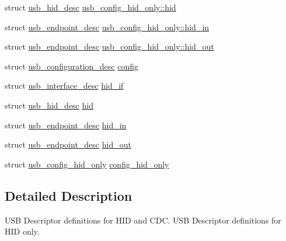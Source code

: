 \begin{DoxyCompactItemize}
\item 
struct \hyperlink{structusb__hid__desc}{usb\-\_\-hid\-\_\-desc} \hyperlink{group___p_i_o_s___u_s_b___d_e_s_c_ga279cdc579474d229bf1bb7963f423423}{usb\-\_\-config\-\_\-hid\-\_\-only\-::hid}
\item 
struct \hyperlink{structusb__endpoint__desc}{usb\-\_\-endpoint\-\_\-desc} \hyperlink{group___p_i_o_s___u_s_b___d_e_s_c_gac0401b402235f315c995eb13de1425ec}{usb\-\_\-config\-\_\-hid\-\_\-only\-::hid\-\_\-in}
\item 
struct \hyperlink{structusb__endpoint__desc}{usb\-\_\-endpoint\-\_\-desc} \hyperlink{group___p_i_o_s___u_s_b___d_e_s_c_ga0bdaf8c80f7739bea621a6d5aa272641}{usb\-\_\-config\-\_\-hid\-\_\-only\-::hid\-\_\-out}
\item 
struct \hyperlink{structusb__configuration__desc}{usb\-\_\-configuration\-\_\-desc} \hyperlink{group___p_i_o_s___u_s_b___d_e_s_c_ga6517677dcb9452a3759e7ec7e360e690}{config}
\item 
struct \hyperlink{structusb__interface__desc}{usb\-\_\-interface\-\_\-desc} \hyperlink{group___p_i_o_s___u_s_b___d_e_s_c_ga66dd41530dc7e219cf377870362857ce}{hid\-\_\-if}
\item 
struct \hyperlink{structusb__hid__desc}{usb\-\_\-hid\-\_\-desc} \hyperlink{group___p_i_o_s___u_s_b___d_e_s_c_ga6eb333cd7c6d156f25fa827aa085579c}{hid}
\item 
struct \hyperlink{structusb__endpoint__desc}{usb\-\_\-endpoint\-\_\-desc} \hyperlink{group___p_i_o_s___u_s_b___d_e_s_c_gad74809997499537622da0aaac4d1c3da}{hid\-\_\-in}
\item 
struct \hyperlink{structusb__endpoint__desc}{usb\-\_\-endpoint\-\_\-desc} \hyperlink{group___p_i_o_s___u_s_b___d_e_s_c_ga0e5a30c27a737b9c3e117e4e8b755b8d}{hid\-\_\-out}
\item 
struct \hyperlink{structusb__config__hid__only}{usb\-\_\-config\-\_\-hid\-\_\-only} \hyperlink{group___p_i_o_s___u_s_b___d_e_s_c_ga4729f56193bb7fb5a7c5115995ec85db}{config\-\_\-hid\-\_\-only}
\end{DoxyCompactItemize}


\subsection{Detailed Description}
U\-S\-B Descriptor definitions for H\-I\-D and C\-D\-C. U\-S\-B Descriptor definitions for H\-I\-D only.

